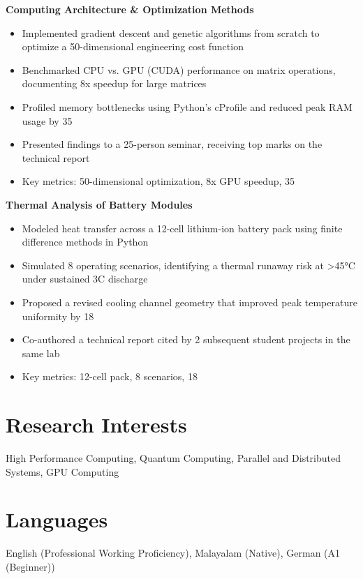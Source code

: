 \documentclass[11pt,a4paper]{article}
\begin{document}
\textbf{ Computing Architecture & Optimization Methods }
\begin{itemize}[leftmargin=*,nosep,topsep=2pt]
    
    \item Implemented gradient descent and genetic algorithms from scratch to optimize a 50-dimensional engineering cost function
    
    \item Benchmarked CPU vs. GPU (CUDA) performance on matrix operations, documenting 8x speedup for large matrices
    
    \item Profiled memory bottlenecks using Python's cProfile and reduced peak RAM usage by 35%
    
    \item Presented findings to a 25-person seminar, receiving top marks on the technical report
    
    \item Key metrics: 50-dimensional optimization, 8x GPU speedup, 35%
    
\end{itemize}

\textbf{ Thermal Analysis of Battery Modules }
\begin{itemize}[leftmargin=*,nosep,topsep=2pt]
    
    \item Modeled heat transfer across a 12-cell lithium-ion battery pack using finite difference methods in Python
    
    \item Simulated 8 operating scenarios, identifying a thermal runaway risk at >45°C under sustained 3C discharge
    
    \item Proposed a revised cooling channel geometry that improved peak temperature uniformity by 18%
    
    \item Co-authored a technical report cited by 2 subsequent student projects in the same lab
    
    \item Key metrics: 12-cell pack, 8 scenarios, 18%
    
\end{itemize}


\section{Research Interests}
High Performance Computing, Quantum Computing, Parallel and Distributed Systems, GPU Computing

\section{Languages}
English (Professional Working Proficiency), Malayalam (Native), German (A1 (Beginner))
\end{document}
